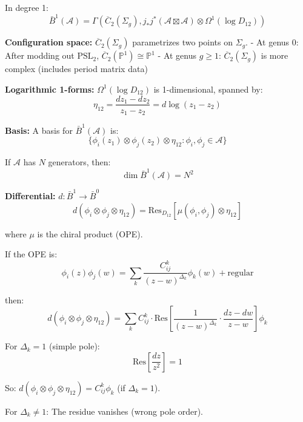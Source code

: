 \begin{computation}\label{comp:deg1-general}
In degree 1:
$$\bar{B}^1(\mathcal{A}) = \Gamma\left(\overline{C}_2(\Sigma_g), j_*j^*(\mathcal{A} \boxtimes \mathcal{A}) \otimes \Omega^1(\log D_{12})\right)$$

\textbf{Configuration space:} $\overline{C}_2(\Sigma_g)$ parametrizes two points on $\Sigma_g$.
- At genus 0: After modding out $\text{PSL}_2$, $\overline{C}_2(\mathbb{P}^1) \cong \mathbb{P}^1$
- At genus $g \geq 1$: $\overline{C}_2(\Sigma_g)$ is more complex (includes period matrix data)

\textbf{Logarithmic 1-forms:} $\Omega^1(\log D_{12})$ is 1-dimensional, spanned by:
$$\eta_{12} = \frac{dz_1 - dz_2}{z_1 - z_2} = d\log(z_1 - z_2)$$

\textbf{Basis:} A basis for $\bar{B}^1(\mathcal{A})$ is:
$$\{\phi_i(z_1) \otimes \phi_j(z_2) \otimes \eta_{12} : \phi_i, \phi_j \in \mathcal{A}\}$$

If $\mathcal{A}$ has $N$ generators, then:
$$\dim \bar{B}^1(\mathcal{A}) = N^2$$

\textbf{Differential:} $d: \bar{B}^1 \to \bar{B}^0$
$$d(\phi_i \otimes \phi_j \otimes \eta_{12}) = \text{Res}_{D_{12}}[\mu(\phi_i, \phi_j) \otimes \eta_{12}]$$

where $\mu$ is the chiral product (OPE).

If the OPE is:
$$\phi_i(z)\phi_j(w) = \sum_k \frac{C_{ij}^k}{(z-w)^{\Delta_k}} \phi_k(w) + \text{regular}$$

then:
$$d(\phi_i \otimes \phi_j \otimes \eta_{12}) = \sum_k C_{ij}^k \cdot \text{Res}\left[\frac{1}{(z-w)^{\Delta_k}} \cdot \frac{dz-dw}{z-w}\right] \phi_k$$

For $\Delta_k = 1$ (simple pole):
$$\text{Res}\left[\frac{dz}{z^2}\right] = 1$$

So: $d(\phi_i \otimes \phi_j \otimes \eta_{12}) = C_{ij}^k \phi_k$ (if $\Delta_k = 1$).

For $\Delta_k \neq 1$: The residue vanishes (wrong pole order).
\end{computation}

